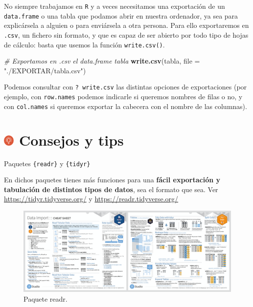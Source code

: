 \documentclass[11pt,]{book}
\newenvironment{Shaded}{\begin{snugshade}}{\end{snugshade}}
\newcommand{\CommentTok}[1]{\textcolor[rgb]{0.37,0.37,0.37}{\textit{#1}}}
\newcommand{\DataTypeTok}[1]{\textcolor[rgb]{0.27,0.27,0.27}{#1}}
\newcommand{\KeywordTok}[1]{\textcolor[rgb]{0.27,0.27,0.27}{\textbf{#1}}}
\newcommand{\NormalTok}[1]{#1}
\newcommand{\StringTok}[1]{\textcolor[rgb]{0.5,0.5,0.5}{#1}}
\begin{document}
No siempre trabajamos en \texttt{R} y a veces necesitamos una exportación de un \texttt{data.frame} o una tabla que podamos abrir en nuestra ordenador, ya sea para explicársela a alguien o para enviársela a otra persona. Para ello exportaremos en \texttt{.csv}, un fichero sin formato, y que es capaz de ser abierto por todo tipo de hojas de cálculo: basta que usemos la función \texttt{write.csv()}.

\begin{Shaded}
\begin{Highlighting}[]
\CommentTok{# Exportamos en .csv el data.frame tabla}
\KeywordTok{write.csv}\NormalTok{(tabla, }\DataTypeTok{file =} \StringTok{"./EXPORTAR/tabla.csv"}\NormalTok{)}
\end{Highlighting}
\end{Shaded}

Podemos consultar con \texttt{?\ write.csv} las distintas opciones de exportaciones (por ejemplo, con \texttt{row.names} podemos indicarle si queremos nombres de filas o no, y con \texttt{col.names} si queremos exportar la cabecera con el nombre de las columnas).

\hypertarget{consejos-y-tips-5}{%
\section[ Consejos y tips]{\texorpdfstring{\protect\includegraphics[width=0.04\textwidth,height=\textheight]{img/logo_info.png} Consejos y tips}{ Consejos y tips}}\label{consejos-y-tips-5}}

Paquetes \texttt{\{readr\}} y \texttt{\{tidyr\}}

En dichos paquetes tienes más funciones para una \textbf{fácil exportación y tabulación de distintos tipos de datos}, sea el formato que sea. Ver \url{https://tidyr.tidyverse.org/} y \url{https://readr.tidyverse.org/}

\begin{figure}

{\centering \includegraphics[width=0.95\linewidth]{./img/readr} 

}

\caption{Paquete readr.}\label{fig:paquete-readr}
\end{figure}
\end{document}
